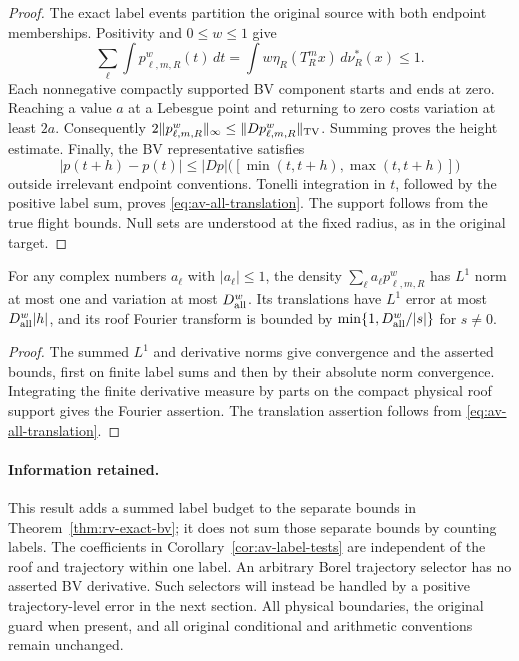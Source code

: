 \begin{proof}
The exact label events partition the original source with both
endpoint memberships.  Positivity and $0\le w\le1$ give
\[
 \sum_\ell\int p^w_{\ell,m,R}(t)\,dt
 =\int w\eta_R(T_R^mx)\,d\nu_R^*(x)\le1.
\]
Each nonnegative compactly supported BV component starts and ends
at zero.  Reaching a value $a$ at a Lebesgue point and returning
to zero costs variation at least $2a$.  Consequently
$2\|p^w_{\ell,m,R}\|_\infty\le\|Dp^w_{\ell,m,R}\|_{\rm TV}$.
Summing proves the height estimate.  Finally, the BV representative
satisfies
\[
 |p(t+h)-p(t)|\le |Dp|\bigl([\min(t,t+h),\max(t,t+h)]\bigr)
\]
outside irrelevant endpoint conventions.  Tonelli integration in
$t$, followed by the positive label sum, proves
\eqref{eq:av-all-translation}.  The support follows from the true
flight bounds.  Null sets are understood at the fixed radius, as in
the original target.
\end{proof}

\begin{corollary}
\label{cor:av-label-tests}
For any complex numbers $a_\ell$ with $|a_\ell|\le1$, the density
$\sum_\ell a_\ell p^w_{\ell,m,R}$ has $L^1$ norm at most one and
variation at most $D_{\rm all}^w$.  Its translations have $L^1$
error at most $D_{\rm all}^w|h|$, and its roof Fourier transform is
bounded by $\min\{1,D_{\rm all}^w/|s|\}$ for $s\ne0$.
\end{corollary}
\begin{proof}
The summed $L^1$ and derivative norms give convergence and the
asserted bounds, first on finite label sums and then by their
absolute norm convergence.  Integrating the finite derivative
measure by parts on the compact physical roof support gives the
Fourier assertion.  The translation assertion follows from
\eqref{eq:av-all-translation}.
\end{proof}

\paragraph{Information retained.}
This result adds a summed label budget to the separate bounds in Theorem~\ref{thm:rv-exact-bv};
it does not sum those separate bounds by counting labels.  The
coefficients in Corollary~\ref{cor:av-label-tests} are independent
of the roof and trajectory within one label.  An arbitrary Borel
trajectory selector has no asserted BV derivative.  Such selectors
will instead be handled by a positive trajectory-level error in the
next section.  All physical boundaries, the original guard when
present, and all original conditional and arithmetic conventions
remain unchanged.
